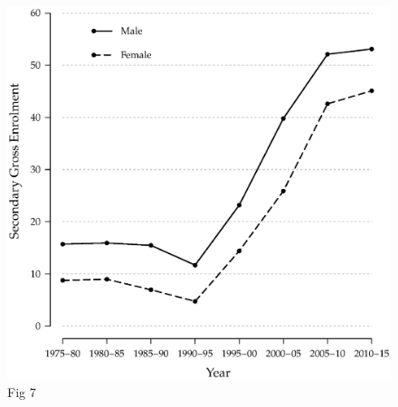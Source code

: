 \documentclass[a4paper, twocolumn]{article}
\begin{document}
\lipsum[1]

\begin{figure}[!hbtp]
\includegraphics[width = \columnwidth]{../figures/fig7.eps}
\caption{Fig 7}
\end{figure}

\lipsum[1]
\end{document}
